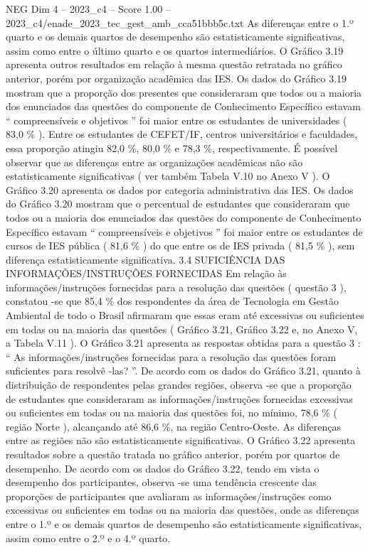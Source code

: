 \begin{textsample}{NEG Dim 4 – 2023\_c4 – Score 1.00 – 2023\_c4/enade\_2023\_tec\_gest\_amb\_cca51bbb5c.txt}
As diferenças entre o 1.º quarto e os demais quartos de desempenho são estatisticamente significativas, assim como entre o último quarto e os quartos intermediários.
O Gráfico 3.19 apresenta outros resultados em relação à mesma questão retratada no gráfico anterior, porém por organização acadêmica das IES.
Os dados do Gráfico 3.19 mostram que a proporção dos presentes que consideraram que todos ou a maioria dos enunciados das questões do componente de Conhecimento Específico estavam “ compreensíveis e objetivos ” foi maior entre os estudantes de universidades ( 83,0 \% ).
Entre os estudantes de CEFET/IF, centros universitários e faculdades, essa proporção atingiu 82,0 \%, 80,0 \% e 78,3 \%, respectivamente.
É possível observar que as diferenças entre as organizações acadêmicas não são estatisticamente significativas ( ver também Tabela V.10 no Anexo V ).
O Gráfico 3.20 apresenta os dados por categoria administrativa das IES.
Os dados do Gráfico 3.20 mostram que o percentual de estudantes que consideraram que todos ou a maioria dos enunciados das questões do componente de Conhecimento Específico estavam “ compreensíveis e objetivos ” foi maior entre os estudantes de cursos de IES pública ( 81,6 \% ) do que entre os de IES privada ( 81,5 \% ), sem diferença estatisticamente significativa. 3.4 SUFICIÊNCIA DAS INFORMAÇÕES/INSTRUÇÕES FORNECIDAS Em relação às informações/instruções fornecidas para a resolução das questões ( questão 3 ), constatou -se que 85,4 \% dos respondentes da área de Tecnologia em Gestão Ambiental de todo o Brasil afirmaram que essas eram até excessivas ou suficientes em todas ou na maioria das questões ( Gráfico 3.21, Gráfico 3.22 e, no Anexo V, a Tabela V.11 ).
O Gráfico 3.21 apresenta as respostas obtidas para a questão 3 : “ As informações/instruções fornecidas para a resolução das questões foram suficientes para resolvê -las? ”.
De acordo com os dados do Gráfico 3.21, quanto à distribuição de respondentes pelas grandes regiões, observa -se que a proporção de estudantes que consideraram as informações/instruções fornecidas excessivas ou suficientes em todas ou na maioria das questões foi, no mínimo, 78,6 \% ( região Norte ), alcançando até 86,6 \%, na região Centro-Oeste.
As diferenças entre as regiões não são estatisticamente significativas.
O Gráfico 3.22 apresenta resultados sobre a questão tratada no gráfico anterior, porém por quartos de desempenho.
De acordo com os dados do Gráfico 3.22, tendo em vista o desempenho dos participantes, observa -se uma tendência crescente das proporções de participantes que avaliaram as informações/instruções como excessivas ou suficientes em todas ou na maioria das questões, onde as diferenças entre o 1.º e os demais quartos de desempenho são estatisticamente significativas, assim como entre o 2.º e o 4.º quarto.

\end{textsample}
